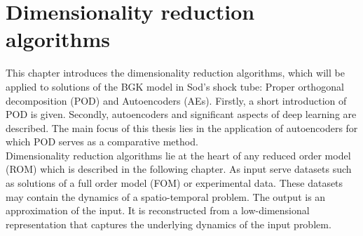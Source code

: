 
\chapter{Dimensionality reduction algorithms}
\label{Ch:DimRedAl}

This chapter introduces the dimensionality reduction algorithms, which will be applied to solutions of the BGK model in Sod's shock tube: Proper orthogonal decomposition (POD) and Autoencoders (AEs). Firstly, a short introduction of POD is given. Secondly, autoencoders and significant aspects of deep learning are described. The main focus of this thesis lies in the application of autoencoders for which POD serves as a comparative method.\\

Dimensionality reduction algorithms lie at the heart of any reduced order model (ROM) which is described in the following chapter. As input serve datasets such as solutions of a full order model (FOM) or experimental data. These datasets may contain the dynamics of a spatio-temporal problem. The output is an approximation of the input. It is reconstructed from a low-dimensional representation that captures the underlying dynamics of the input problem.  
